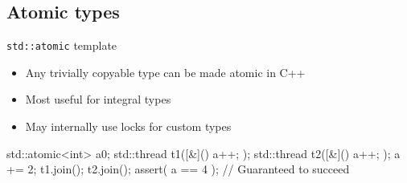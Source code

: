\subsection[atomic]{Atomic types}

\begin{frame}[fragile]
  \begin{block}{\texttt{std::atomic} template}
    \begin{itemize}
      \item Any trivially copyable type can be made atomic in C++
      \item Most useful for integral types
      \item May internally use locks for custom types
    \end{itemize}
  \end{block}
  \begin{exampleblock}{}
    \begin{cppcode*}{}
      std::atomic<int> a{0};
      std::thread t1([&](){ a++; });
      std::thread t2([&](){ a++; });
      a += 2;
      t1.join(); t2.join();
      assert( a == 4 ); // Guaranteed to succeed
    \end{cppcode*}
  \end{exampleblock}
\end{frame}

